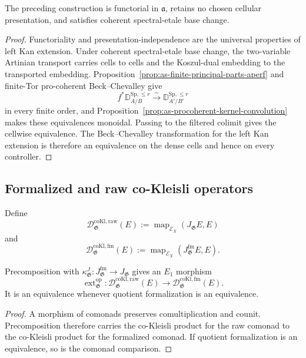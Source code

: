 \begin{proposition}
\label{prop:as-cellular-operator-independence}
The preceding construction is functorial in $\mathfrak a$, retains no chosen
cellular presentation, and satisfies coherent spectral-etale base change.
\end{proposition}

\begin{proof}
Functoriality and presentation-independence are the universal properties of
left Kan extension.  Under coherent spectral-etale base change, the
two-variable Artinian transport carries cells to cells and the Koszul-dual
embedding to the transported embedding.  Proposition~\ref{prop:as-finite-principal-parts-aperf} and finite-Tor pro-coherent
Beck--Chevalley give
\[
    f^*
    \mathbb D_{A/B}^{\mathrm{Sp},\le r}
    \xrightarrow{\sim}
    \mathbb D_{A'/B'}^{\mathrm{Sp},\le r}
\]
in every finite order, and
Proposition~\ref{prop:as-procoherent-kernel-convolution} makes these
equivalences monoidal.  Passing to the filtered colimit gives the cellwise
equivalence.  The Beck--Chevalley transformation for the left Kan extension
is therefore an equivalence on the dense cells and hence on every
controller.
\end{proof}

\subsection{Formalized and raw co-Kleisli operators}

Define
\[
    \mathcal D_{\mathfrak G}^{\mathrm{coKl,raw}}(E)
    :=
    \operatorname{map}_{\mathcal E_X}(J_{\mathfrak G}E,E)
\]
and
\[
    \mathcal D_{\mathfrak G}^{\mathrm{coKl,fm}}(E)
    :=
    \operatorname{map}_{\mathcal E_X}(J_{\mathfrak G}^{\mathrm{fm}}E,E).
\]

\begin{proposition}
\label{prop:as-formalized-raw-operator-restriction}
Precomposition with
$\kappa^J_{\mathfrak G}:J_{\mathfrak G}^{\mathrm{fm}}\to J_{\mathfrak G}$
gives an $E_1$ morphism
\[
\boxed{
    \operatorname{ext}_{\mathfrak G}^{\mathrm{op}}:
    \mathcal D_{\mathfrak G}^{\mathrm{coKl,raw}}(E)
    \longrightarrow
    \mathcal D_{\mathfrak G}^{\mathrm{coKl,fm}}(E).
}
\]
It is an equivalence whenever quotient formalization is an equivalence.
\end{proposition}

\begin{proof}
A morphism of comonads preserves comultiplication and counit.
Precomposition therefore carries the co-Kleisli product for the raw comonad
to the co-Kleisli product for the formalized comonad.  If quotient
formalization is an equivalence, so is the comonad comparison.
\end{proof}

